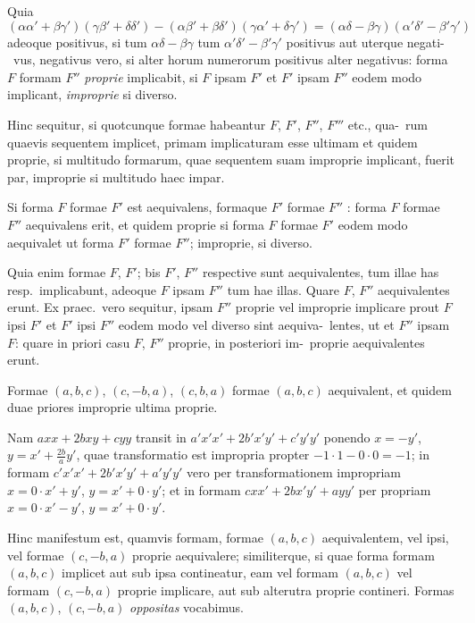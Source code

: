 \documentclass[12pt,a4paper]{article}
\theoremstyle{plain}
\theoremstyle{definition}
\theoremstyle{remark}
\begin{document}
Quia
\[
(\alpha\alpha' + \beta\gamma')(\gamma\beta' + \delta\delta') - (\alpha\beta' + \beta\delta')(\gamma\alpha' + \delta\gamma') = (\alpha\delta - \beta\gamma)(\alpha'\delta' - \beta'\gamma')
\]
adeoque positivus, si tum $\alpha\delta - \beta\gamma$ tum $\alpha'\delta' - \beta'\gamma'$ positivus aut uterque negati-\ vus, negativus vero, si alter horum numerorum positivus alter negativus: forma
$F$ formam $F''$ \emph{proprie} implicabit, si $F$ ipsam $F'$ et $F'$ ipsam $F''$ eodem modo
implicant, \emph{improprie} si diverso.

Hinc sequitur, si quotcunque formae habeantur $F$, $F'$, $F''$, $F'''$ etc., qua-\ rum quaevis sequentem implicet, primam implicaturam esse ultimam et quidem
proprie, si multitudo formarum, quae sequentem suam improprie implicant, fuerit
par, improprie si multitudo haec impar.

Si forma $F$ formae $F'$ est aequivalens, formaque $F'$ formae $F''$ : forma $F$
formae $F''$ aequivalens erit, et quidem proprie si forma $F$ formae $F'$ eodem modo
aequivalet ut forma $F'$ formae $F''$; improprie, si diverso.

Quia enim formae $F$, $F'$; bis $F'$, $F''$ respective sunt aequivalentes, tum
illae has resp.\ implicabunt, adeoque $F$ ipsam $F''$ tum hae illas. Quare $F$, $F''$
aequivalentes erunt. Ex praec.\ vero sequitur, ipsam $F''$ proprie vel improprie
implicare prout $F$ ipsi $F'$ et $F'$ ipsi $F''$ eodem modo vel diverso sint aequiva-\ lentes, ut et $F''$ ipsam $F$: quare in priori casu $F$, $F''$ proprie, in posteriori im-\ proprie aequivalentes erunt.

Formae $(a, b, c)$, $(c, -b, a)$, $(c, b, a)$ formae $(a,b,c)$ aequivalent, et quidem
duae priores improprie ultima proprie.

Nam $axx + 2bxy + cyy$ transit in $a'x'x' + 2b'x'y' + c'y'y'$ ponendo
$x = -y'$, $y = x' + \frac{2b}{a}y'$, quae transformatio est impropria propter $-1 \cdot 1 - 0 \cdot 0 = -1$; in formam $c'x'x' + 2b'x'y' + a'y'y'$ vero per transformationem impropriam
$x = 0 \cdot x' + y'$, $y = x' + 0 \cdot y'$; et in formam $cxx' + 2bx'y' + ayy'$ per propriam
$x = 0 \cdot x' - y'$, $y = x' + 0 \cdot y'$.

Hinc manifestum est, quamvis formam, formae $(a,b,c)$ aequivalentem, vel
ipsi, vel formae $(c, -b, a)$ proprie aequivalere; similiterque, si quae forma formam
$(a,b,c)$ implicet aut sub ipsa contineatur, eam vel formam $(a,b,c)$ vel formam
$(c, -b, a)$ proprie implicare, aut sub alterutra proprie contineri. Formas
$(a,b,c)$, $(c, -b, a)$ \emph{oppositas} vocabimus.
\end{document}
